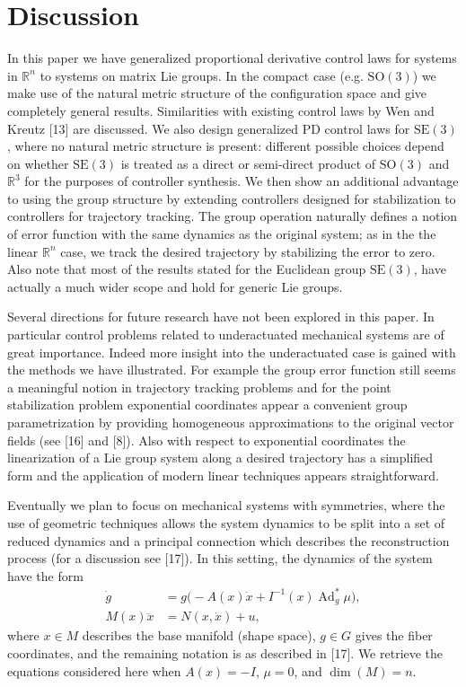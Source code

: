 \documentclass[10pt,twocolumn]{article}
\newcommand{\SO}{\mathrm{SO}}
\newcommand{\SE}{\mathrm{SE}}
\newcommand{\Ad}{\operatorname{Ad}}
\newcommand{\R}{\mathbb R}
\begin{document}
\section{Discussion}
In this paper we have generalized proportional derivative control laws for systems in $\R^n$ to systems on matrix Lie groups. In the compact case (e.g. $\SO(3)$) we make use of the natural metric structure of the configuration space and give completely general results. Similarities with existing control laws by Wen and Kreutz [13] are discussed. We also design generalized PD control laws for $\SE(3)$, where no natural metric structure is present: different possible choices depend on whether $\SE(3)$ is treated as a direct or semi-direct product of $\SO(3)$ and $\R^3$ for the purposes of controller synthesis. We then show an additional advantage to using the group structure by extending controllers designed for stabilization to controllers for trajectory tracking. The group operation naturally defines a notion of error function with the same dynamics as the original system; as in the the linear $\R^n$ case, we track the desired trajectory by stabilizing the error to zero. Also note that most of the results stated for the Euclidean group $\SE(3)$, have actually a much wider scope and hold for generic Lie groups.

Several directions for future research have not been explored in this paper. In particular control problems related to underactuated mechanical systems are of great importance. Indeed more insight into the underactuated case is gained with the methods we have illustrated. For example the group error function still seems a meaningful notion in trajectory tracking problems and for the point stabilization problem exponential coordinates appear a convenient group parametrization by providing homogeneous approximations to the original vector fields (see [16] and [8]). Also with respect to exponential coordinates the linearization of a Lie group system along a desired trajectory has a simplified form and the application of modern linear techniques appears straightforward.

Eventually we plan to focus on mechanical systems with symmetries, where the use of geometric techniques allows the system dynamics to be split into a set of reduced dynamics and a principal connection which describes the reconstruction process (for a discussion see [17]). In this setting, the dynamics of the system have the form
\begin{align*}
\dot g&=g\bigl(-A(x)\dot x+I^{-1}(x)\Ad_g^*\mu\bigr),\\
M(x)\ddot x&=N(x,\dot x)+u,
\end{align*}
where $x\in M$ describes the base manifold (shape space), $g\in G$ gives the fiber coordinates, and the remaining notation is as described in [17]. We retrieve the equations considered here when $A(x)=-I$, $\mu=0$, and $\dim(M)=n$.
\end{document}
